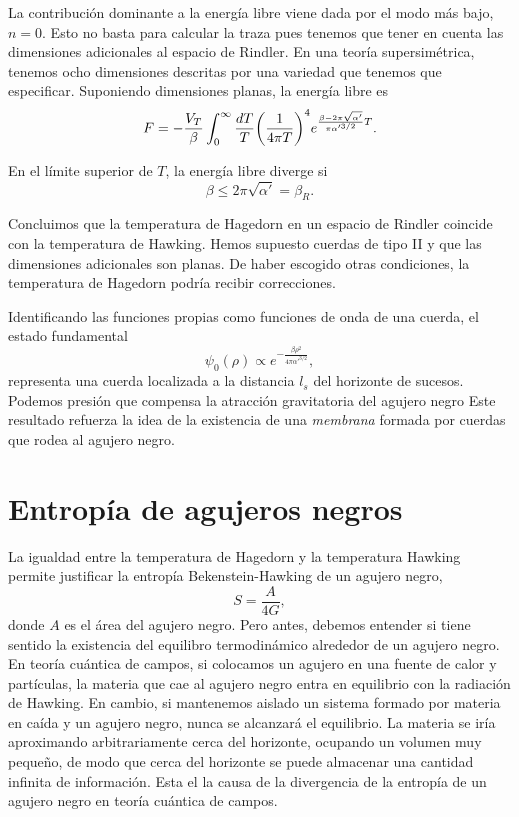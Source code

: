 La contribución dominante a la energía libre viene dada por el modo más bajo, $n=0$.
Esto no basta para calcular la traza pues tenemos que tener en cuenta las dimensiones adicionales al espacio de Rindler. 
En una teoría supersimétrica, tenemos ocho dimensiones descritas por una variedad que tenemos que especificar.
Suponiendo dimensiones planas, la energía libre es
\begin{equation}
  F= -\frac{V_T}{\beta}\int_0^\infty \frac{dT}{T}\qty(\frac{1}{4\pi T})^4 e^{\frac{\beta-2\pi\sqrt{\alpha'}}{\pi\alpha'^{3/2}}T}.
\end{equation}

En el límite superior de $T$, la energía libre diverge si
\begin{equation}
  \beta \leq 2\pi\sqrt{\alpha'}=\beta_R.
\end{equation}

Concluimos que la temperatura de Hagedorn en un espacio de Rindler coincide con la temperatura
de Hawking.
Hemos supuesto cuerdas de tipo II y que las dimensiones adicionales son planas.
De haber escogido otras condiciones, la temperatura de Hagedorn podría recibir correcciones.

Identificando las funciones propias como funciones de onda de una cuerda, el estado fundamental
\begin{equation}
  \psi_0(\rho)\propto e^{-\frac{\beta \rho^2}{4\pi\alpha'^{3/2}} },
  \label{eq:func}
\end{equation}
representa una cuerda localizada a la distancia $l_s$ del horizonte de sucesos.
Podemos  presión que compensa la atracción gravitatoria del agujero negro
Este resultado refuerza la idea de la existencia de una \emph{membrana} formada por cuerdas
que rodea al agujero negro.


\section{Entropía de agujeros negros}

La igualdad entre la temperatura de Hagedorn y la temperatura Hawking permite justificar
la entropía Bekenstein-Hawking de un agujero negro,
\begin{equation}
  S = \frac{A}{4G},
\end{equation}
donde $A$ es el área del agujero negro.
Pero antes, debemos entender si tiene sentido la existencia del equilibro termodinámico alrededor
de un agujero negro. 
En teoría cuántica de campos, si colocamos un agujero en una fuente de calor y partículas, 
la materia que cae al agujero negro entra en equilibrio con la radiación de Hawking.
En cambio, si mantenemos aislado un sistema formado por materia en caída y un agujero
negro, nunca se alcanzará el equilibrio.
La materia se iría aproximando arbitrariamente cerca del horizonte, ocupando un volumen muy
pequeño, de modo que cerca del horizonte se puede almacenar una cantidad infinita de información.
Esta el la causa de la divergencia de la entropía de un agujero negro en teoría cuántica de campos.


